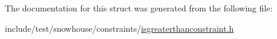 The documentation for this struct was generated from the following file\+:\begin{DoxyCompactItemize}
\item 
include/test/snowhouse/constraints/\mbox{\hyperlink{isgreaterthanconstraint_8h}{isgreaterthanconstraint.\+h}}\end{DoxyCompactItemize}
